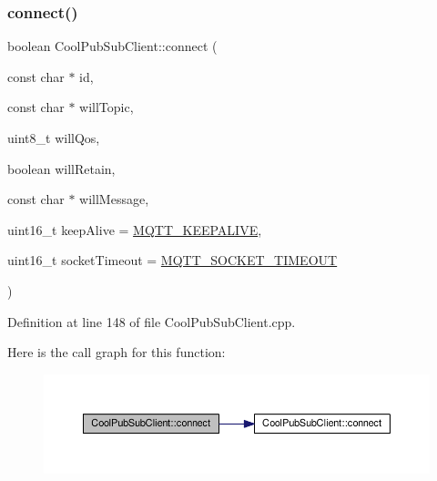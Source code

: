 \subsubsection{\texorpdfstring{connect()}{connect()}\hspace{0.1cm}{\footnotesize\ttfamily [3/4]}}
{\footnotesize\ttfamily boolean Cool\+Pub\+Sub\+Client\+::connect (\begin{DoxyParamCaption}\item[{const char $\ast$}]{id,  }\item[{const char $\ast$}]{will\+Topic,  }\item[{uint8\+\_\+t}]{will\+Qos,  }\item[{boolean}]{will\+Retain,  }\item[{const char $\ast$}]{will\+Message,  }\item[{uint16\+\_\+t}]{keep\+Alive = {\ttfamily \hyperlink{_cool_pub_sub_client_8h_afb4dd8c75385ab30e659314df7c2c335}{M\+Q\+T\+T\+\_\+\+K\+E\+E\+P\+A\+L\+I\+VE}},  }\item[{uint16\+\_\+t}]{socket\+Timeout = {\ttfamily \hyperlink{_cool_pub_sub_client_8h_a092cc564e4d7f03fdab6137e30a7f05b}{M\+Q\+T\+T\+\_\+\+S\+O\+C\+K\+E\+T\+\_\+\+T\+I\+M\+E\+O\+UT}} }\end{DoxyParamCaption})}



Definition at line 148 of file Cool\+Pub\+Sub\+Client.\+cpp.

Here is the call graph for this function\+:\nopagebreak
\begin{figure}[H]
\begin{center}
\leavevmode
\includegraphics[width=350pt]{class_cool_pub_sub_client_af461a5a08fda1c3237e706965704ddb6_cgraph}
\end{center}
\end{figure}
\mbox{\label{class_cool_pub_sub_client_a7e5a85731dd25d90a41f6d859e61da77}} 

